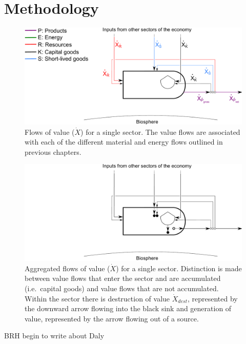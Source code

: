 \section{Methodology}
\label{sec:Value_Methodology}

\begin{figure}[!ht]
\centering
\includegraphics[width=0.8\linewidth]{Part_2/Chapter_Values/images/PERKS_basic_unit_value_all.pdf}
\caption[Flows of value for a single sector]{Flows of value ($\dot{X}$) 
for a single sector. 
The value flows are associated with each of the different 
material and energy flows outlined in previous chapters.}
\label{fig:basic_value} 
\end{figure}

\begin{figure}[!ht]
\centering
\includegraphics[width=0.8\linewidth]{Part_2/Chapter_Values/images/PERKS_basic_unit_value.pdf}
\caption[Aggregated flows of value for a single sector]{Aggregated flows of value ($\dot{X}$) 
for a single sector. 
Distinction is made between value flows that 
enter the sector and are accumulated (i.e.\ capital goods) 
and value flows that are not accumulated. 
Within the sector there is destruction of value $\dot{X}_{dest}$, 
represented by the downward arrow flowing 
into the black sink and generation of value, 
represented by the arrow flowing out of a source. }
\label{fig:basic_value_aggregated} 
\end{figure}

BRH begin to write about Daly \cite{daly1995}


